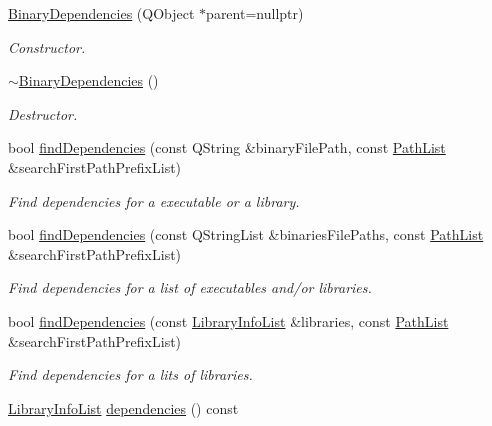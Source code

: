 \begin{DoxyCompactItemize}
\item 
\hyperlink{class_mdt_1_1_deploy_utils_1_1_binary_dependencies_aa4decd7ce7db7292738f6d300445e6b0}{Binary\+Dependencies} (Q\+Object $\ast$parent=nullptr)
\begin{DoxyCompactList}\small\item\em Constructor. \end{DoxyCompactList}\item 
\hyperlink{class_mdt_1_1_deploy_utils_1_1_binary_dependencies_a6bb36d0457ccd40462edb70cefc25bba}{$\sim$\+Binary\+Dependencies} ()
\begin{DoxyCompactList}\small\item\em Destructor. \end{DoxyCompactList}\item 
bool \hyperlink{class_mdt_1_1_deploy_utils_1_1_binary_dependencies_ab57081aeb3581d58f5677129ce564013}{find\+Dependencies} (const Q\+String \&binary\+File\+Path, const \hyperlink{class_mdt_1_1_deploy_utils_1_1_path_list}{Path\+List} \&search\+First\+Path\+Prefix\+List)
\begin{DoxyCompactList}\small\item\em Find dependencies for a executable or a library. \end{DoxyCompactList}\item 
bool \hyperlink{class_mdt_1_1_deploy_utils_1_1_binary_dependencies_a6b2116711ce9bbc3b3523eac16af28ec}{find\+Dependencies} (const Q\+String\+List \&binaries\+File\+Paths, const \hyperlink{class_mdt_1_1_deploy_utils_1_1_path_list}{Path\+List} \&search\+First\+Path\+Prefix\+List)
\begin{DoxyCompactList}\small\item\em Find dependencies for a list of executables and/or libraries. \end{DoxyCompactList}\item 
bool \hyperlink{class_mdt_1_1_deploy_utils_1_1_binary_dependencies_a99b12cd9e28d27d33d416a51e116f54e}{find\+Dependencies} (const \hyperlink{class_mdt_1_1_deploy_utils_1_1_library_info_list}{Library\+Info\+List} \&libraries, const \hyperlink{class_mdt_1_1_deploy_utils_1_1_path_list}{Path\+List} \&search\+First\+Path\+Prefix\+List)
\begin{DoxyCompactList}\small\item\em Find dependencies for a lits of libraries. \end{DoxyCompactList}\item 
\hyperlink{class_mdt_1_1_deploy_utils_1_1_library_info_list}{Library\+Info\+List} \hyperlink{class_mdt_1_1_deploy_utils_1_1_binary_dependencies_a53e68f923a4c13493eba8990eaf6b5ef}{dependencies} () const 

\end{DoxyCompactItemize}
